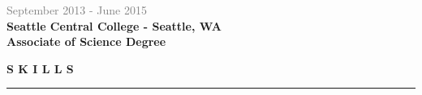 \documentclass[letterpage]{article}
\begin{document}
\begin{minipage}[t]{0.424\linewidth}
\textcolor{gray}{September 2013 - June 2015}\\
\textbf{\textsf{Seattle Central College - Seattle, WA}}\\
\textbf{Associate of Science Degree}
\vspace{19px}

\textbf{\fontsize{14px}{1px}\selectfont S K I L L S}\\
\noindent\rule{2.45in}{0.1pt}
\vspace{0px}\\
\begin{minipage}[t]{0.01\linewidth}
\end{minipage}
\: %


\end{minipage}
\end{document}
